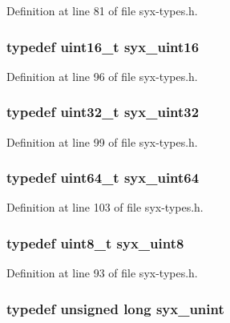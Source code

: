 Definition at line 81 of file syx-types.h.\hypertarget{syx-types_8h_5c0caeeeb45b4575061ab7f368f10337}{
\subsubsection{\setlength{\rightskip}{0pt plus 5cm}typedef uint16\_\-t {\bf syx\_\-uint16}}}
\label{syx-types_8h_5c0caeeeb45b4575061ab7f368f10337}




Definition at line 96 of file syx-types.h.\hypertarget{syx-types_8h_eb2d8221bf07737360750e4c0ec66a99}{
\subsubsection{\setlength{\rightskip}{0pt plus 5cm}typedef uint32\_\-t {\bf syx\_\-uint32}}}
\label{syx-types_8h_eb2d8221bf07737360750e4c0ec66a99}




Definition at line 99 of file syx-types.h.\hypertarget{syx-types_8h_5a7750bec2122e7d3fccdffa19e87efe}{
\subsubsection{\setlength{\rightskip}{0pt plus 5cm}typedef uint64\_\-t {\bf syx\_\-uint64}}}
\label{syx-types_8h_5a7750bec2122e7d3fccdffa19e87efe}




Definition at line 103 of file syx-types.h.\hypertarget{syx-types_8h_7cb1870b8124a88e807c98f315f3d923}{
\subsubsection{\setlength{\rightskip}{0pt plus 5cm}typedef uint8\_\-t {\bf syx\_\-uint8}}}
\label{syx-types_8h_7cb1870b8124a88e807c98f315f3d923}




Definition at line 93 of file syx-types.h.\hypertarget{syx-types_8h_8126e64ffb4098d51f48eb5c7c1167ed}{
\subsubsection{\setlength{\rightskip}{0pt plus 5cm}typedef unsigned long {\bf syx\_\-unint}}}
\label{syx-types_8h_8126e64ffb4098d51f48eb5c7c1167ed}




